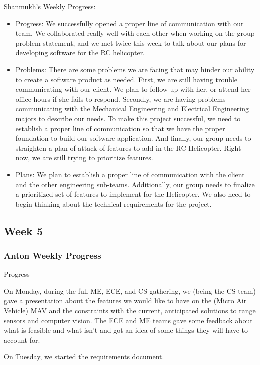 \documentclass[onecolumn, oneside, letterpaper, draftclsnofoot, 10pt, compsoc]{IEEEtran}
\begin{document}
Shanmukh's Weekly Progress:
\begin{itemize}
    \item Progress: We successfully opened a proper line of communication with our team. We collaborated really well with each other when working on the group problem statement, and we met twice this week to talk about our plans for developing software for the RC helicopter.
    \item Problems: There are some problems we are facing that may hinder our ability to create a software product as needed. First, we are still having trouble communicating with our client. We plan to follow up with her, or attend her office hours if she fails to respond. Secondly, we are having problems communicating with the Mechanical Engineering and Electrical Engineering majors to describe our needs. To make this project successful, we need to establish a proper line of communication so that we have the proper foundation to build our software application. And finally, our group needs to straighten a plan of attack of features to add in the RC Helicopter. Right now, we are still trying to prioritize features.
    \item Plans: We plan to establish a proper line of communication with the client and the other engineering sub-teams. Additionally, our group needs to finalize a prioritized set of features to implement for the Helicopter. We also need to begin thinking about the technical requirements for the project.
\end{itemize}

\subsection{Week 5}

\subsubsection{Anton Weekly Progress}
Progress

On Monday, during the full ME, ECE, and CS gathering, we (being the CS team) gave a presentation about the features we would like to have on the (Micro Air Vehicle) MAV and the constraints with the current, anticipated solutions to range sensors and computer vision. The ECE and ME teams gave some feedback about what is feasible and what isn't and got an idea of some things they will have to account for.

On Tuesday, we started the requirements document.
\end{document}
